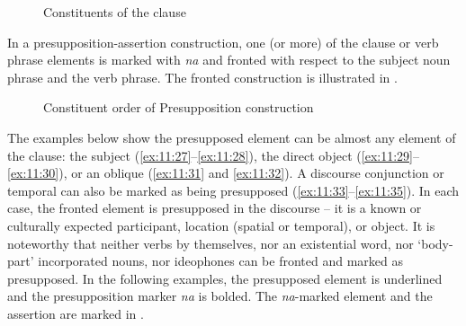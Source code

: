 \begin{figure}
\caption{Constituents of the clause\label{fig:18}}
\end{figure}

In a presupposition-assertion construction, one (or more) of the clause or verb phrase elements is marked with \textit{na} and fronted with respect to the subject noun phrase and the verb phrase. The fronted construction is illustrated in . 

\begin{figure}
\caption{Constituent order of Presupposition construction\label{fig:19}}
\end{figure}

The examples below show the presupposed element can be almost any element of the clause: the subject (\ref{ex:11:27}--\ref{ex:11:28}), the direct object (\ref{ex:11:29}--\ref{ex:11:30}), or an oblique (\ref{ex:11:31} and \ref{ex:11:32}). A discourse conjunction or temporal can also be marked as being presupposed (\ref{ex:11:33}--\ref{ex:11:35}). In each case, the fronted element is presupposed in the discourse -- it is a known or culturally expected participant, location (spatial or temporal), or object. It is noteworthy that neither verbs by themselves, nor an existential word, nor ‘body-part’ incorporated nouns, nor ideophones can be fronted and marked as presupposed. In the following examples, the presupposed element is underlined and the presupposition marker \textit{na} is bolded.  The \textit{na}-marked element and the assertion are marked in .
 \\

